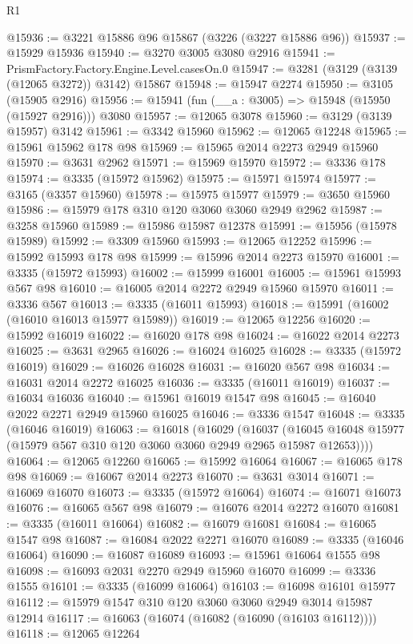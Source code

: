 \begin{lexlean}{R1}
\begin{coremodule}
@15936 := @3221 @15886 @96 @15867 (@3226 (@3227 @15886 @96))
@15937 := @15929 @15936
@15940 := @3270 @3005 @3080 @2916
@15941 := PrismFactory.Factory.Engine.Level.casesOn.{0}
@15947 := @3281 (@3129 (@3139 (@12065 @3272)) @3142) @15867
@15948 := @15947 @2274
@15950 := @3105 (@15905 @2916)
@15956 := @15941 (fun (__a : @3005) => @15948 (@15950 (@15927 @2916))) @3080
@15957 := @12065 @3078
@15960 := @3129 (@3139 @15957) @3142
@15961 := @3342 @15960
@15962 := @12065 @12248
@15965 := @15961 @15962 @178 @98
@15969 := @15965 @2014 @2273 @2949 @15960
@15970 := @3631 @2962
@15971 := @15969 @15970
@15972 := @3336 @178
@15974 := @3335 (@15972 @15962)
@15975 := @15971 @15974
@15977 := @3165 (@3357 @15960)
@15978 := @15975 @15977
@15979 := @3650 @15960
@15986 := @15979 @178 @310 @120 @3060 @3060 @2949 @2962
@15987 := @3258 @15960
@15989 := @15986 @15987 @12378
@15991 := @15956 (@15978 @15989)
@15992 := @3309 @15960
@15993 := @12065 @12252
@15996 := @15992 @15993 @178 @98
@15999 := @15996 @2014 @2273 @15970
@16001 := @3335 (@15972 @15993)
@16002 := @15999 @16001
@16005 := @15961 @15993 @567 @98
@16010 := @16005 @2014 @2272 @2949 @15960 @15970
@16011 := @3336 @567
@16013 := @3335 (@16011 @15993)
@16018 := @15991 (@16002 (@16010 @16013 @15977 @15989))
@16019 := @12065 @12256
@16020 := @15992 @16019
@16022 := @16020 @178 @98
@16024 := @16022 @2014 @2273
@16025 := @3631 @2965
@16026 := @16024 @16025
@16028 := @3335 (@15972 @16019)
@16029 := @16026 @16028
@16031 := @16020 @567 @98
@16034 := @16031 @2014 @2272 @16025
@16036 := @3335 (@16011 @16019)
@16037 := @16034 @16036
@16040 := @15961 @16019 @1547 @98
@16045 := @16040 @2022 @2271 @2949 @15960 @16025
@16046 := @3336 @1547
@16048 := @3335 (@16046 @16019)
@16063 := @16018
    (@16029
      (@16037 (@16045 @16048 @15977 (@15979 @567 @310 @120 @3060 @3060 @2949 @2965 @15987 @12653))))
@16064 := @12065 @12260
@16065 := @15992 @16064
@16067 := @16065 @178 @98
@16069 := @16067 @2014 @2273
@16070 := @3631 @3014
@16071 := @16069 @16070
@16073 := @3335 (@15972 @16064)
@16074 := @16071 @16073
@16076 := @16065 @567 @98
@16079 := @16076 @2014 @2272 @16070
@16081 := @3335 (@16011 @16064)
@16082 := @16079 @16081
@16084 := @16065 @1547 @98
@16087 := @16084 @2022 @2271 @16070
@16089 := @3335 (@16046 @16064)
@16090 := @16087 @16089
@16093 := @15961 @16064 @1555 @98
@16098 := @16093 @2031 @2270 @2949 @15960 @16070
@16099 := @3336 @1555
@16101 := @3335 (@16099 @16064)
@16103 := @16098 @16101 @15977
@16112 := @15979 @1547 @310 @120 @3060 @3060 @2949 @3014 @15987 @12914
@16117 := @16063 (@16074 (@16082 (@16090 (@16103 @16112))))
@16118 := @12065 @12264

\end{coremodule}
\end{lexlean}
